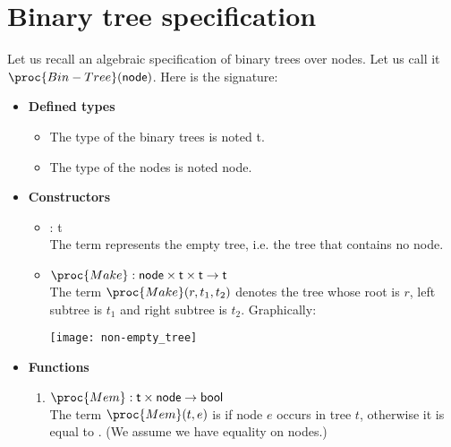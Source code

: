 \documentclass[11pt,a4paper]{article}
\author{Christian Rinderknecht}
\date{17 June 2005}
\newcommand\type[1]{\textsf{#1}}
\begin{document}
\maketitle

\section{Binary tree specification}

Let us recall an algebraic specification of binary trees over
nodes. Let us call it \(\proc{Bin-Tree}(\type{node})\). Here is the
signature:
\begin{itemize}

  \item \textbf{Defined types}

  \begin{itemize}

    \item The type of the binary trees is noted \type{t}.

    \item The type of the nodes is noted \type{node}.
  
  \end{itemize}

  \item \textbf{Constructors}
  \begin{itemize}

    \item {} : \type{t}\\
    The term  represents the empty tree, i.e. the tree
    that contains no node.

    \item \(\proc{Make} : \type{node} \times \type{t} \times
    \type{t} \rightarrow \type{t}\)\\ The term \(\proc{Make}
    (r, t_1, t_2)\) denotes the tree whose root is \(r\), left
    subtree is \(t_1\) and right subtree is \(t_2\). Graphically:
    \begin{center}
      \texttt{[image: non-empty\_tree]}
    \end{center}

  \end{itemize}

  \item \textbf{Functions}
  \begin{enumerate}

     \item \(\proc{Mem}: \type{t} \times \type{node} \rightarrow
     \type{bool}\)\\
     The term \(\proc{Mem} (t, e)\) is  if node \(e\)
     occurs in tree \(t\), otherwise it is equal to
     . (We assume we have equality on nodes.)


\end{enumerate}
\end{itemize}
\end{document}
